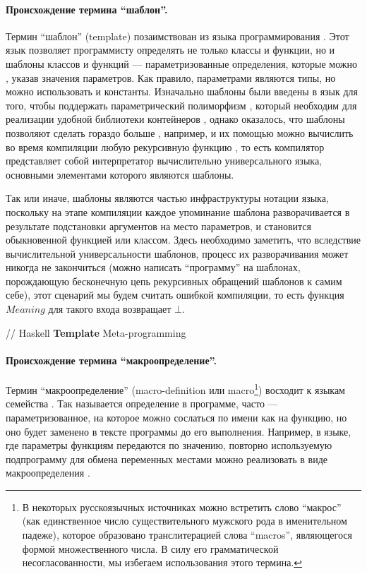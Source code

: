 {\paragraph*{Происхождение термина ``шаблон''.} Термин ``шаблон'' (template) позаимствован из языка программирования  \cite{???}. Этот язык позволяет программисту определять не только классы и функции, но и шаблоны классов и функций --- параметризованные определения, которые можно , указав значения параметров. Как правило, параметрами являются типы, но можно использовать и константы. Изначально шаблоны были введены в язык для того, чтобы поддержать параметрический полиморфизм \cite{???}, который необходим для реализации удобной библиотеки контейнеров \cite{???}, однако оказалось, что шаблоны позволяют сделать гораздо больше \cite{???}, например, и их помощью можно вычислить во время компиляции любую рекурсивную функцию \cite{???}, то есть компилятор  представляет собой интерпретатор вычислительно универсального языка, основными элементами которого являются шаблоны.

Так или иначе, шаблоны являются частью инфраструктуры нотации языка, поскольку на этапе компиляции каждое упоминание шаблона разворачивается в результате подстановки аргументов на место параметров, и становится обыкновенной функцией или классом. Здесь необходимо заметить, что вследствие вычислительной универсальности шаблонов, процесс их разворачивания может никогда не закончиться (можно написать ``программу'' на шаблонах, порождающую бесконечную цепь рекурсивных обращений шаблонов к самим себе), этот сценарий мы будем считать ошибкой компиляции, то есть функция $Meaning$ для такого входа возвращает $\bot$.

// Haskell \textbf{Template} Meta-programming

\paragraph*{Происхождение термина ``макроопределение''.} Термин ``макроопределение'' (macro-definition или macro\footnote{В некоторых русскоязычных источниках можно встретить слово ``макрос'' (как единственное число существительного мужского рода в именительном падеже), которое образовано транслитерацией слова ``macros'', являющегося формой множественного числа. В силу его грамматической несогласованности, мы избегаем использования этого термина.}) восходит к языкам семейства  \cite{???}. Так называется определение в программе, часто --- параметризованное, на которое можно сослаться по имени как на функцию, но оно будет заменено в тексте программы до его выполнения. Например, в языке, где параметры функциям передаются по значению, повторно используемую подпрограмму для обмена переменных местами можно реализовать в виде макроопределения \cite{???}.

}
